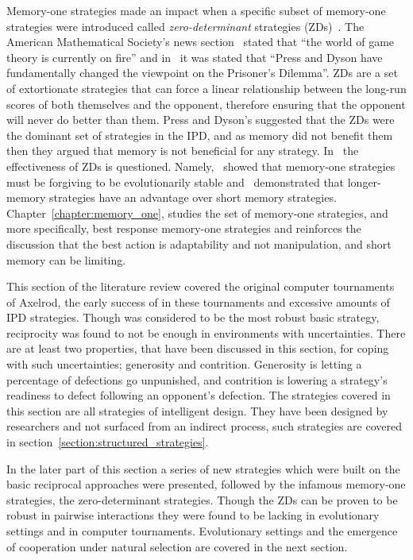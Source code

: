 Memory-one strategies made an impact when a specific subset of memory-one
strategies were introduced called \textit{zero-determinant} strategies
(ZDs)~\cite{Press2012}. The American Mathematical Society's news section~\cite{Hilbe2015}
stated that ``the world of game theory is currently on fire'' and in~\cite{Stewart2012}
it was stated that
``Press and Dyson have fundamentally changed the viewpoint on the Prisoner's Dilemma''.
ZDs are a set of
extortionate strategies that can force a linear relationship between
the long-run scores of both themselves and the opponent, therefore ensuring that the
opponent will never do better than them. Press and Dyson's suggested that the ZDs
were the dominant set of strategies in the
IPD, and as memory did not benefit them then they argued that memory is not
beneficial for any strategy. In~\cite{Adami2013, Knight2017, Hilbe2017,
Hilbe2013b, Hilbe2013, Hilbe2015, KnightHGC17, Knight2019, Lee2015, Pan2015,
Stewart2012, Stewart2013, Stewart2016} the effectiveness of ZDs is questioned.
Namely,~\cite{Stewart2013, Stewart2016} showed that memory-one strategies must
be forgiving to be evolutionarily stable and~\cite{Cox1999, Knight2017, Hilbe2017,
KnightHGC17, Knight2019, Lee2015, Pan2015} demonstrated
that longer-memory strategies have an advantage over short memory
strategies. Chapter~\ref{chapter:memory_one}, studies the set of memory-one strategies,
and more specifically, best response memory-one strategies and reinforces the
discussion that the best action is adaptability and not manipulation, and short
memory can be limiting.

This section of the literature review covered the original computer tournaments of
Axelrod, the early success of \TitForTat in these tournaments and excessive
amounts of IPD strategies. Though \TitForTat was
considered to be the most robust basic strategy, reciprocity was found to not
be enough in environments with uncertainties. There are at least two properties,
that have been discussed in this section, for coping with such uncertainties;
generosity and contrition. Generosity is letting a percentage of defections go
unpunished, and contrition is lowering a strategy's readiness to defect
following an opponent's defection. The strategies covered in this section are all
strategies of intelligent design. They have been designed by researchers and
not surfaced from an indirect process, such strategies are covered in
section~\ref{section:structured_strategies}.

In the later part of this section a series of new strategies which were built on
the basic reciprocal approaches were presented, followed by the infamous memory-one
strategies, the zero-determinant strategies. Though the ZDs can be proven to be robust
in pairwise interactions they were found to be lacking in evolutionary settings
and in computer tournaments. Evolutionary settings and the emergence
of cooperation under natural selection are covered in the next section.

